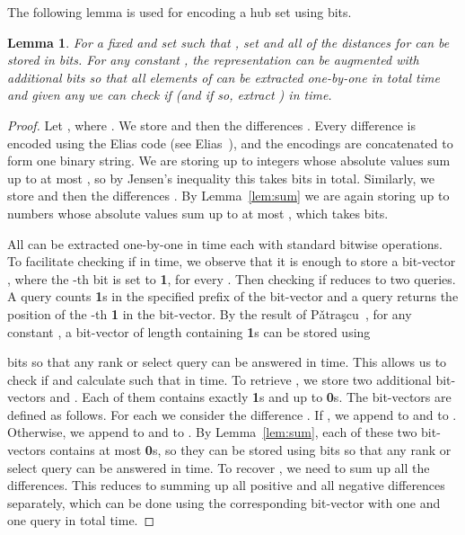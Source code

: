 \documentclass{article}[11pt,letter]
\newtheorem{lemma}[definition]{Lemma}
\begin{document}
The following lemma is used for encoding a hub set  using  bits.

\begin{lemma}
\label{lem:set_encoding}
For a fixed  and set  such that , set  and all of the distances  for  can be stored in  bits. For any constant , the representation
can be augmented with  additional bits so that all elements of  can
be extracted one-by-one in  total time and given any  we can check if 
(and if so, extract ) in  time.
\end{lemma}


\begin{proof}
Let , where . We store  and then the differences . Every difference is encoded using the Elias  code (see Elias~\cite{EliasGamma}), and the encodings are concatenated to form one binary
string. We are storing up to  integers whose absolute values sum up to at most , so by Jensen's inequality this takes  bits in total. Similarly, we store  and then the differences . By Lemma~\ref{lem:sum} we are again storing up to  numbers whose absolute values sum up to at most , which takes  bits.

All  can be extracted one-by-one in  time each with standard bitwise operations.
To facilitate checking if  in  time, we observe that it is enough to store a bit-vector
, where the -th bit is set to {\bf 1}, for every . Then checking if
 reduces to two  queries. A  query counts {\bf 1}s in the specified prefix of the bit-vector and a  query returns the position of the -th {\bf 1} in the bit-vector. By
the result of P\v{a}tra\c{s}cu~\cite{Succincter}, for any constant , a bit-vector of length  containing 
{\bf 1}s can be stored using

bits so that any rank or select query can be answered in  time.
This allows us to check if  and calculate  such that  in  time. To retrieve
, we store two additional bit-vectors  and . Each of them contains exactly
 {\bf 1}s and up to  {\bf 0}s. The bit-vectors are defined as follows. For each 
we consider the difference . If , we append
 to  and  to . Otherwise, we append
 to  and  to . By Lemma~\ref{lem:sum}, each of these
two bit-vectors contains at most  {\bf 0}s, so they can be stored using
 bits so that any rank or select query can be answered
in  time. To recover , we need to sum up all the differences. This reduces
to summing up all positive and all negative differences separately, which can be done using the
corresponding bit-vector with one  and one  query in  total time.
\end{proof}
\end{document}
